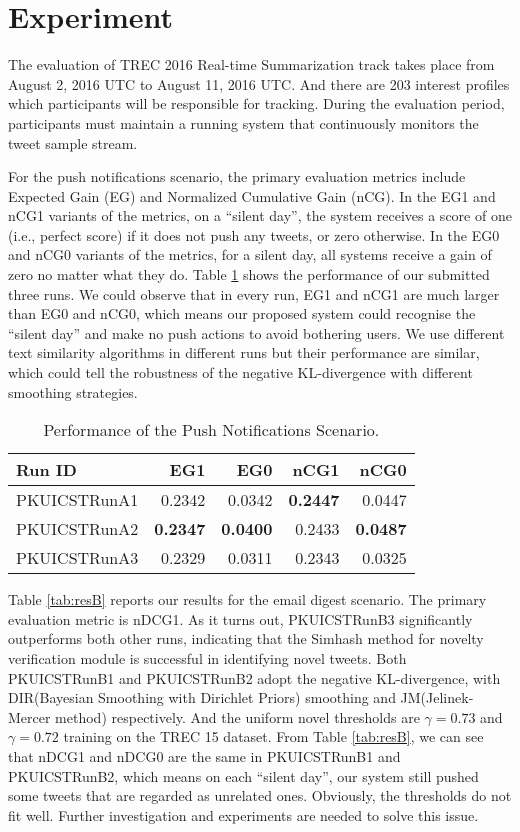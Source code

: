 \section{Experiment}
The evaluation of TREC 2016 Real-time Summarization track takes place from
August 2, 2016 UTC to August 11, 2016 UTC.
And there are 203 interest profiles which participants will be responsible for tracking.
During the evaluation period, participants must maintain a running system
that continuously monitors the tweet sample stream.

For the push notifications scenario, the primary evaluation metrics
include Expected Gain (EG) and Normalized Cumulative Gain (nCG).
In the EG1 and nCG1 variants of the metrics, on a ``silent day'',
the system receives a score of one (i.e., perfect score) if it does not push any tweets,
or zero otherwise. In the EG0 and nCG0 variants of the metrics, for a silent day,
all systems receive a gain of zero no matter what they do.
Table \ref{tab:resA} shows the performance of our submitted three runs.
We could observe that in every run, EG1 and nCG1 are much larger than EG0 and nCG0,
which means our proposed system could recognise the ``silent day''
and make no push actions to avoid bothering users.
We use different text similarity algorithms in different runs
but their performance are similar, which could tell the robustness
of the negative KL-divergence with different smoothing strategies.

\begin{table}[htbp]
\centering
\caption{Performance of the Push Notifications Scenario.}
\label{tab:resA}
\begin{tabular}{lrrrr}
\hline
Run ID&EG1&EG0&nCG1&nCG0\\
\hline
PKUICSTRunA1&0.2342&0.0342&\textbf{0.2447}&0.0447\\
PKUICSTRunA2&\textbf{0.2347}&\textbf{0.0400}&0.2433&\textbf{0.0487}\\
PKUICSTRunA3&0.2329&0.0311&0.2343&0.0325\\
\hline
\end{tabular}
\end{table}

Table \ref{tab:resB} reports our results for the email digest scenario.
The primary evaluation metric is nDCG1.
As it turns out, PKUICSTRunB3 significantly outperforms both other runs,
indicating that the Simhash method for novelty verification module is successful in identifying novel tweets.
Both PKUICSTRunB1 and PKUICSTRunB2 adopt the negative KL-divergence,
with DIR(Bayesian Smoothing with Dirichlet Priors) smoothing and JM(Jelinek-Mercer method) respectively.
And the uniform novel thresholds are $\gamma=0.73$ and $\gamma=0.72$ training on the TREC 15 dataset.
From Table \ref{tab:resB}, we can see that nDCG1 and nDCG0 are the same in PKUICSTRunB1 and PKUICSTRunB2,
which means on each ``silent day'', our system still pushed some tweets that are regarded as unrelated ones.
Obviously, the thresholds do not fit well. Further investigation and experiments are needed to solve this issue.

